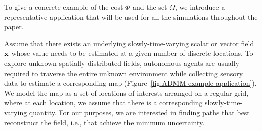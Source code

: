 \documentclass[journal]{IEEEtran}  %
\begin{document}
To give a concrete example of the cost $\varPhi$ and the set $\Omega$, we introduce a representative application that will be used for all the simulations throughout the paper.
\begin{example} Assume that there exists an underlying slowly-time-varying scalar or vector field $\mathbf{x}$ whose value needs to be estimated at a given number of discrete locations. To explore unknown spatially-distributed fields, autonomous agents are usually required to traverse the entire unknown environment while collecting sensory data to estimate a corresponding map (Figure~\ref{fig:ADMM-example-application}). We model the map as a set of locations of interests arranged on a regular grid, where at each location, we assume that there is a corresponding slowly-time-varying quantity. For our purposes, we are interested in finding paths that best reconstruct the field, i.e., that achieve the minimum uncertainty. 
\end{example}
\end{document}
